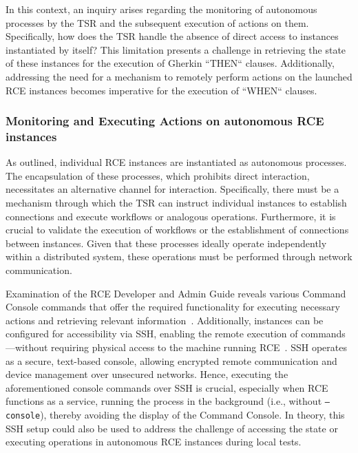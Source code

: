 In this context, an inquiry arises regarding the monitoring of autonomous processes by the \ac{TSR} and the subsequent execution of actions on them. Specifically, how does the \ac{TSR} handle the absence of direct access to instances instantiated by itself? This limitation presents a challenge in retrieving the state of these instances for the execution of Gherkin ``THEN`` clauses. Additionally, addressing the need for a mechanism to remotely perform actions on the launched RCE instances becomes imperative for the execution of ``WHEN`` clauses.


\subsubsection{Monitoring and Executing Actions on autonomous RCE instances}
As outlined, individual RCE instances are instantiated as autonomous processes. The encapsulation of these processes, which prohibits direct interaction, necessitates an alternative channel for interaction. Specifically, there must be a mechanism through which the \ac{TSR} can instruct individual instances to establish connections and execute workflows or analogous operations. Furthermore, it is crucial to validate the execution of workflows or the establishment of connections between instances. Given that these processes ideally operate independently within a distributed system, these operations must be performed through network communication.

Examination of the \ac{RCE} Developer and Admin Guide reveals various Command Console commands that offer the required functionality for executing necessary actions and retrieving relevant information~\cite{rceDevGuide10x}. Additionally, instances can be configured for accessibility via \ac{SSH}, enabling the remote execution of commands—without requiring physical access to the machine running RCE~\cite{rceDevGuide10x}. \ac{SSH} operates as a secure, text-based console, allowing encrypted remote communication and device management over unsecured networks. Hence, executing the aforementioned console commands over \ac{SSH} is crucial, especially when \ac{RCE} functions as a service, running the process in the background (i.e., without \texttt{--console}), thereby avoiding the display of the Command Console. In theory, this \ac{SSH} setup could also be used to address the challenge of accessing the state or executing operations in autonomous \ac{RCE} instances during local tests.

